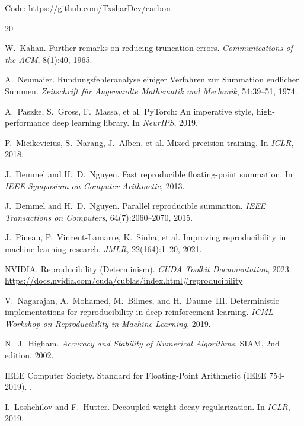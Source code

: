 \documentclass[11pt,a4paper]{article}
\begin{document}
Code: \url{https://github.com/TxsharDev/carbon}

\begin{thebibliography}{20}

W.~Kahan.
\newblock Further remarks on reducing truncation errors.
\newblock \emph{Communications of the ACM}, 8(1):40, 1965.

A.~Neumaier.
\newblock Rundungsfehleranalyse einiger Verfahren zur Summation endlicher Summen.
\newblock \emph{Zeitschrift f\"ur Angewandte Mathematik und Mechanik}, 54:39--51, 1974.

A.~Paszke, S.~Gross, F.~Massa, et al.
\newblock PyTorch: An imperative style, high-performance deep learning library.
\newblock In \emph{NeurIPS}, 2019.

P.~Micikevicius, S.~Narang, J.~Alben, et al.
\newblock Mixed precision training.
\newblock In \emph{ICLR}, 2018.

J.~Demmel and H.~D.~Nguyen.
\newblock Fast reproducible floating-point summation.
\newblock In \emph{IEEE Symposium on Computer Arithmetic}, 2013.

J.~Demmel and H.~D.~Nguyen.
\newblock Parallel reproducible summation.
\newblock \emph{IEEE Transactions on Computers}, 64(7):2060--2070, 2015.

J.~Pineau, P.~Vincent-Lamarre, K.~Sinha, et al.
\newblock Improving reproducibility in machine learning research.
\newblock \emph{JMLR}, 22(164):1--20, 2021.

NVIDIA.
\newblock Reproducibility (Determinism).
\newblock \emph{CUDA Toolkit Documentation}, 2023.
\newblock \url{https://docs.nvidia.com/cuda/cublas/index.html#reproducibility}

V.~Nagarajan, A.~Mohamed, M.~Bilmes, and H.~Daume~III.
\newblock Deterministic implementations for reproducibility in deep reinforcement learning.
\newblock \emph{ICML Workshop on Reproducibility in Machine Learning}, 2019.

N.~J.~Higham.
\newblock \emph{Accuracy and Stability of Numerical Algorithms}.
\newblock SIAM, 2nd edition, 2002.

IEEE Computer Society.
 Standard for Floating-Point Arithmetic ({IEEE} 754-2019).
.

I.~Loshchilov and F.~Hutter.
\newblock Decoupled weight decay regularization.
\newblock In \emph{ICLR}, 2019.

\end{thebibliography}
\end{document}
